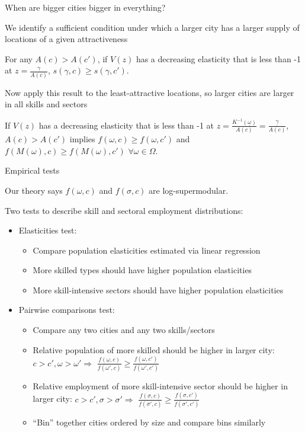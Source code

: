 \documentclass[10pt,notes=hide]{beamer}
\begin{document}
\begin{frame}{When are bigger cities bigger in everything?}

We identify a sufficient condition under which a larger city has a
larger supply of locations of a given attractiveness
\begin{proposition}
\label{prop:AbsoluteSize}For any $A(c)>A(c')$, if $V(z)$ has a
decreasing elasticity that is less than -1 at $z=\frac{\gamma}{A(c)}$,
$s(\gamma,c)\geq s(\gamma,c')$.
\end{proposition}
Now apply this result to the least-attractive locations, so larger
cities are larger in all skills and sectors
\begin{corollary}
\label{cor:AbsoluteSize}If $V(z)$ has a decreasing elasticity that
is less than -1 at $z=\frac{K^{-1}(\underline{\omega})}{A(c)}=\frac{\underline{\gamma}}{A(c)}$,
$A(c)>A(c')$ implies $f(\omega,c)\geq f(\omega,c')$ and $f(M(\omega),c)\geq f(M(\omega),c')$
$\forall\omega\in\Omega$.
\end{corollary}

\end{frame}
\begin{frame}{Empirical tests}

Our theory says $f(\omega,c)$ and $f(\sigma,c)$ are log-supermodular. 

Two tests to describe skill and sectoral employment distributions:
\begin{itemize}
\item Elasticities test: 

\begin{itemize}
\item Compare population elasticities estimated via linear regression
\item More skilled types should have higher population elasticities
\item More skill-intensive sectors should have higher population elasticities
\end{itemize}
\item Pairwise comparisons test:

\begin{itemize}
\item Compare any two cities and any two skills/sectors
\item Relative population of more skilled should be higher in larger city:
$c>c',\omega>\omega'\Rightarrow$ $\frac{f(\omega,c)}{f(\omega',c)}\geq\frac{f(\omega,c')}{f(\omega',c')}$
\item Relative employment of more skill-intensive sector should be higher
in larger city: $c>c',\sigma>\sigma'\Rightarrow$ $\frac{f(\sigma,c)}{f(\sigma',c)}\geq\frac{f(\sigma,c')}{f(\sigma',c')}$
\item ``Bin'' together cities ordered by size and compare bins similarly
\end{itemize}
\end{itemize}

\end{frame}
\end{document}
